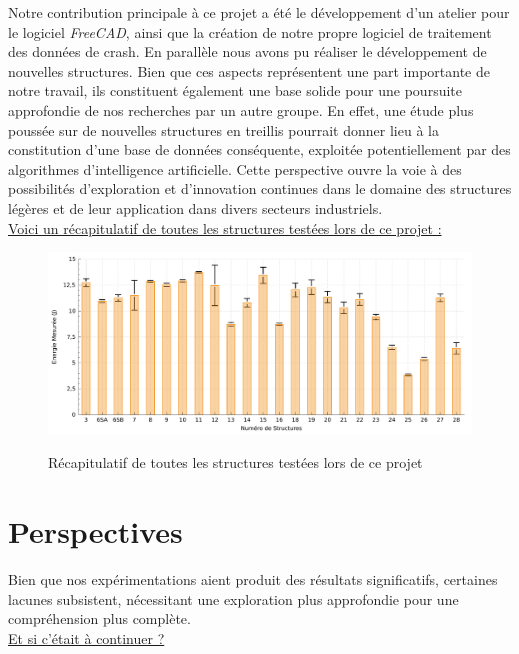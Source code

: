 \documentclass[a4paper]{article}
\begin{document}
	Notre contribution principale à ce projet a été le développement d'un atelier pour le logiciel \textit{FreeCAD}, ainsi que la création de notre propre logiciel de traitement des données de crash. En parallèle nous avons pu réaliser le développement de nouvelles structures. Bien que ces aspects représentent une part importante de notre travail, ils constituent également une base solide pour une poursuite approfondie de nos recherches par un autre groupe. En effet, une étude plus poussée sur de nouvelles structures en treillis pourrait donner lieu à la constitution d'une base de données conséquente, exploitée potentiellement par des algorithmes d'intelligence artificielle. Cette perspective ouvre la voie à des possibilités d'exploration et d'innovation continues dans le domaine des structures légères et de leur application dans divers secteurs industriels.\\
	
	\underline{Voici un récapitulatif de toutes les structures testées lors de ce projet :}
	
	\begin{figure}[H]
		\centering
		\includegraphics[width=16cm]{Images/10/structures_testees.pdf}\\
		\caption{Récapitulatif de toutes les structures testées lors de ce projet}
	\end{figure}
	\newpage
	
	\section{Perspectives}
	\hspace{0.5cm}Bien que nos expérimentations aient produit des résultats significatifs, certaines lacunes subsistent, nécessitant une exploration plus approfondie pour une compréhension plus complète.\\
	
	\underline{Et si c'était à continuer ?}\\
	
\end{document}
